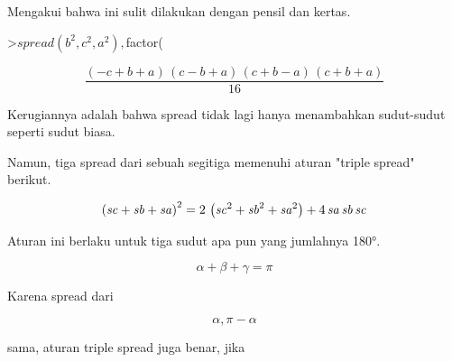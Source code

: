 \documentclass[12pt,arial,letterpaper]{book}
\begin{document}
\begin{eulercomment}
\begin{eulercomment}
\begin{eulercomment}
\begin{eulercomment}
\begin{eulercomment}
\begin{eulercomment}
\begin{eulercomment}
\begin{eulercomment}
\begin{eulercomment}
\begin{eulercomment}
\begin{eulercomment}
\begin{eulercomment}
\begin{eulercomment}
\begin{eulercomment}
\begin{eulercomment}
\begin{eulercomment}
\begin{eulercomment}
\begin{eulercomment}
\begin{eulercomment}
\begin{eulercomment}
\begin{eulercomment}
\begin{eulercomment}
\begin{eulercomment}
\begin{eulercomment}
\begin{eulercomment}
\begin{eulercomment}
\begin{eulercomment}
\begin{eulercomment}
\begin{eulercomment}
Mengakui bahwa ini sulit dilakukan dengan pensil dan kertas.
\end{eulercomment}
\begin{eulerprompt}
>$spread(b^2,c^2,a^2), $factor(%
\end{eulerprompt}
\begin{eulerformula}
\[
\frac{\left(-c+b+a\right)\,\left(c-b+a\right)\,\left(c+b-a\right)\,  \left(c+b+a\right)}{16}
\]
\end{eulerformula}
\begin{eulercomment}
Kerugiannya adalah bahwa spread tidak lagi hanya menambahkan
sudut-sudut seperti sudut biasa.

Namun, tiga spread dari sebuah segitiga memenuhi aturan "triple
spread" berikut.
\end{eulercomment}
\begin{eulerformula}
\[
\left({\it sc}+{\it sb}+{\it sa}\right)^2=2\,\left({\it sc}^2+  {\it sb}^2+{\it sa}^2\right)+4\,{\it sa}\,{\it sb}\,{\it sc}
\]
\end{eulerformula}
\begin{eulercomment}
Aturan ini berlaku untuk tiga sudut apa pun yang jumlahnya 180°.

\end{eulercomment}
\begin{eulerformula}
\[
\alpha+\beta+\gamma=\pi
\]
\end{eulerformula}
\begin{eulercomment}
Karena spread dari

\end{eulercomment}
\begin{eulerformula}
\[
\alpha, \pi-\alpha
\]
\end{eulerformula}
\begin{eulercomment}
sama, aturan triple spread juga benar, jika


\end{eulercomment}
\end{eulercomment}
\end{eulercomment}
\end{eulercomment}
\end{eulercomment}
\end{eulercomment}
\end{eulercomment}
\end{eulercomment}
\end{eulercomment}
\end{eulercomment}
\end{eulercomment}
\end{eulercomment}
\end{eulercomment}
\end{eulercomment}
\end{eulercomment}
\end{eulercomment}
\end{eulercomment}
\end{eulercomment}
\end{eulercomment}
\end{eulercomment}
\end{eulercomment}
\end{eulercomment}
\end{eulercomment}
\end{eulercomment}
\end{eulercomment}
\end{eulercomment}
\end{eulercomment}
\end{eulercomment}
\end{eulercomment}
\end{document}

